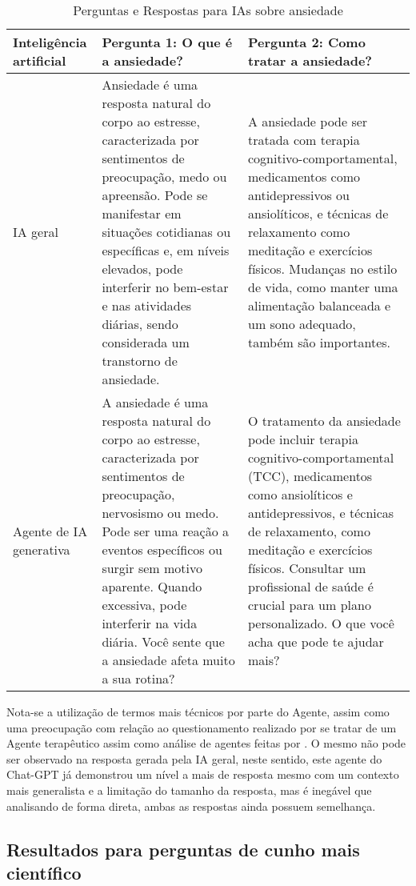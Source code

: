\documentclass{article}
\begin{document}
\begin{table}[h]
    \centering
    \begin{tabular}{|p{4cm}|p{4cm}|p{4cm}|}
    \hline
    \textbf{Inteligência artificial} &
    \textbf{Pergunta 1:} O que é a ansiedade? &
    \textbf{Pergunta 2:} Como tratar a ansiedade? \\
    \hline
    IA geral &
    Ansiedade é uma resposta natural do corpo ao estresse, caracterizada por sentimentos de preocupação, medo ou apreensão. Pode se manifestar em situações cotidianas ou específicas e, em níveis elevados, pode interferir no bem-estar e nas atividades diárias, sendo considerada um transtorno de ansiedade. &
    A ansiedade pode ser tratada com terapia cognitivo-comportamental, medicamentos como antidepressivos ou ansiolíticos, e técnicas de relaxamento como meditação e exercícios físicos. Mudanças no estilo de vida, como manter uma alimentação balanceada e um sono adequado, também são importantes. \\
    \hline
    Agente de IA generativa &
    A ansiedade é uma resposta natural do corpo ao estresse, caracterizada por sentimentos de preocupação, nervosismo ou medo. Pode ser uma reação a eventos específicos ou surgir sem motivo aparente. Quando excessiva, pode interferir na vida diária. Você sente que a ansiedade afeta muito a sua rotina? &
    O tratamento da ansiedade pode incluir terapia cognitivo-comportamental (TCC), medicamentos como ansiolíticos e antidepressivos, e técnicas de relaxamento, como meditação e exercícios físicos. Consultar um profissional de saúde é crucial para um plano personalizado. O que você acha que pode te ajudar mais? \\
    \hline
    \end{tabular}
    \caption{Perguntas e Respostas para IAs sobre ansiedade}
    \label{tab:ia_ansiedade}
\end{table}

Nota-se a utilização de termos mais técnicos por parte do Agente, assim como uma preocupação com relação ao questionamento realizado por se tratar de um Agente terapêutico assim como análise de agentes feitas por \cite{Sampaio2024}. O mesmo não pode ser observado na resposta gerada pela IA geral, neste sentido, este agente do Chat-GPT já demonstrou um nível a mais de resposta mesmo com um contexto mais generalista e a limitação do tamanho da resposta, mas é inegável que analisando de forma direta, ambas as respostas ainda possuem semelhança.

\subsection{Resultados para perguntas de cunho mais científico}
\end{document}
